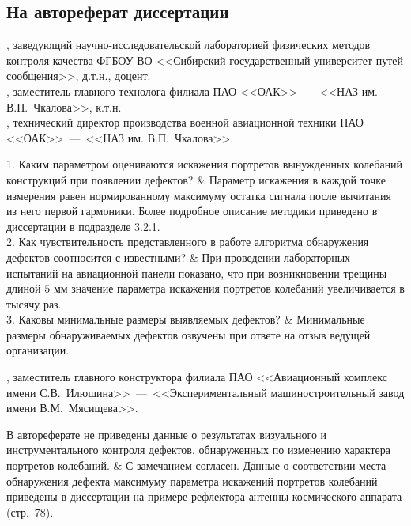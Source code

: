 \subsection{На автореферат диссертации}

\begin{frame}
	\vspace{0.5em}
	, заведующий научно-исследовательской лабораторией физических методов контроля качества ФГБОУ ВО <<Сибирский государственный университет путей сообщения>>, д.т.н., доцент. \\
	, заместитель главного технолога филиала ПАО <<ОАК>>~---~<<НАЗ им. В.П.~Чкалова>>, к.т.н. \\
	, технический директор производства военной авиационной техники ПАО <<ОАК>>~---~<<НАЗ им. В.П.~Чкалова>>. \\
	\begin{comtblr}{12em}
		1. Каким параметром оцениваются искажения портретов вынужденных колебаний конструкций при появлении дефектов?
		& 
		Параметр искажения в каждой точке измерения равен нормированному максимуму остатка сигнала после вычитания из него первой гармоники. Более подробное описание методики приведено в диссертации в подразделе 3.2.1. \\
		2. Как чувствительность представленного в работе алгоритма обнаружения дефектов соотносится с известными? 
		&
		При проведении лабораторных испытаний на авиационной панели показано, что при возникновении трещины длиной $ 5 $ мм значение параметра искажения портретов колебаний увеличивается в тысячу раз. \\
		3. Каковы минимальные размеры выявляемых дефектов?
		&
		Минимальные размеры обнаруживаемых дефектов озвучены при ответе на отзыв ведущей организации. \\
	\end{comtblr}
\end{frame}

\begin{frame}
	\beginSkip
	, заместитель главного конструктора филиала ПАО <<Авиационный комплекс имени С.В.~Илюшина>>~---~<<Экспериментальный машиностроительный завод имени В.М.~Мясищева>>.
	\begin{comtblr}{}
		В автореферате не приведены данные о результатах визуального и инструментального контроля дефектов, обнаруженных по изменению характера портретов колебаний.
		& 
		С замечанием согласен. Данные о соответствии места обнаружения дефекта максимуму параметра искажений портретов колебаний приведены в диссертации на примере рефлектора антенны космического аппарата (стр.~78).
	\end{comtblr}
\end{frame}

